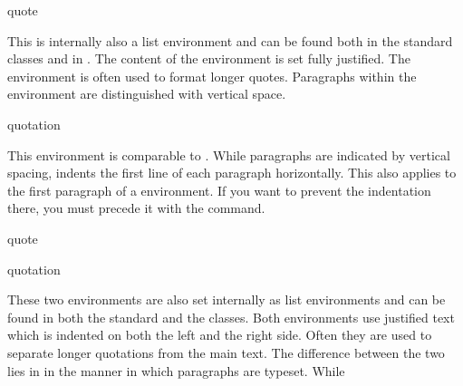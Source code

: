   \fi
  \EndIndexGroup

  \iffalse%
    \begin{Declaration}
  	  \begin{Environment}{quote}\end{Environment}
  	\end{Declaration}%
  	This is
  	internally also a list environment and can be found both in the standard classes and in
  	{\KOMAScript}. The content of the environment is set fully justified.
    The environment is often used to format longer quotes.
    Paragraphs within the environment are distinguished with vertical space.%
    \EndIndexGroup
  
    \begin{Declaration}
      \begin{Environment}{quotation}\end{Environment}
    \end{Declaration}%
    This
    environment is comparable to
    . While
     paragraphs are indicated by
    vertical spacing,  indents the first line of each
    paragraph horizontally. This also applies to the first paragraph of a
     environment. If you want to prevent the
    indentation there, you must precede it with the
     command.%
  \else
    \begin{Declaration}
      \begin{Environment}{quote}\end{Environment}
      \begin{Environment}{quotation}\end{Environment}
    \end{Declaration}%
     These two
    environments are also set internally as list
    environments and can be found in both the standard and the {\KOMAScript}
    classes. Both environments use justified text which is indented on both
    the left and the right side. Often they are used to separate longer
    quotations from the main text. The difference between
    the two lies in in the manner in which paragraphs are typeset. While
